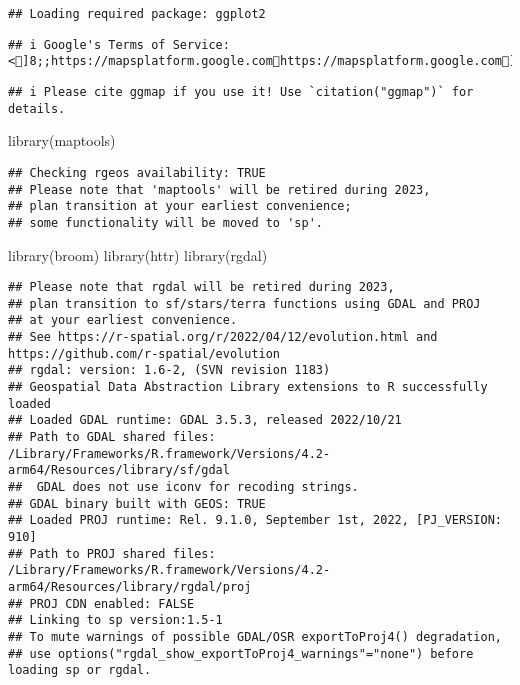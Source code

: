 \documentclass[
]{article}
\newenvironment{Shaded}{\begin{snugshade}}{\end{snugshade}}
\newcommand{\FunctionTok}[1]{\textcolor[rgb]{0.00,0.00,0.00}{#1}}
\newcommand{\NormalTok}[1]{#1}
\begin{document}
\begin{verbatim}
## Loading required package: ggplot2
\end{verbatim}

\begin{verbatim}
## i Google's Terms of Service: <]8;;https://mapsplatform.google.comhttps://mapsplatform.google.com]8;;>
\end{verbatim}

\begin{verbatim}
## i Please cite ggmap if you use it! Use `citation("ggmap")` for details.
\end{verbatim}

\begin{Shaded}
\begin{Highlighting}[]
\FunctionTok{library}\NormalTok{(maptools)}
\end{Highlighting}
\end{Shaded}

\begin{verbatim}
## Checking rgeos availability: TRUE
## Please note that 'maptools' will be retired during 2023,
## plan transition at your earliest convenience;
## some functionality will be moved to 'sp'.
\end{verbatim}

\begin{Shaded}
\begin{Highlighting}[]
\FunctionTok{library}\NormalTok{(broom)}
\FunctionTok{library}\NormalTok{(httr)}
\FunctionTok{library}\NormalTok{(rgdal)}
\end{Highlighting}
\end{Shaded}

\begin{verbatim}
## Please note that rgdal will be retired during 2023,
## plan transition to sf/stars/terra functions using GDAL and PROJ
## at your earliest convenience.
## See https://r-spatial.org/r/2022/04/12/evolution.html and https://github.com/r-spatial/evolution
## rgdal: version: 1.6-2, (SVN revision 1183)
## Geospatial Data Abstraction Library extensions to R successfully loaded
## Loaded GDAL runtime: GDAL 3.5.3, released 2022/10/21
## Path to GDAL shared files: /Library/Frameworks/R.framework/Versions/4.2-arm64/Resources/library/sf/gdal
##  GDAL does not use iconv for recoding strings.
## GDAL binary built with GEOS: TRUE 
## Loaded PROJ runtime: Rel. 9.1.0, September 1st, 2022, [PJ_VERSION: 910]
## Path to PROJ shared files: /Library/Frameworks/R.framework/Versions/4.2-arm64/Resources/library/rgdal/proj
## PROJ CDN enabled: FALSE
## Linking to sp version:1.5-1
## To mute warnings of possible GDAL/OSR exportToProj4() degradation,
## use options("rgdal_show_exportToProj4_warnings"="none") before loading sp or rgdal.
\end{verbatim}
\end{document}
